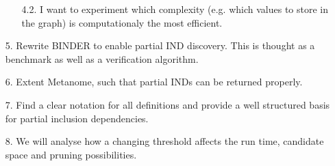 \begin{itemize}
\begin{itemize}
        \item[4.2.] I want to experiment which complexity (e.g. which values to store in the graph) is computationaly the most efficient. 
    \end{itemize}
    \item[5.] Rewrite BINDER to enable partial IND discovery. This is thought as a benchmark as well as a verification algorithm.
    \item[6.] Extent Metanome, such that partial INDs can be returned properly.
    \item[7.] Find a clear notation for all definitions and provide a well structured basis for partial inclusion dependencies.
    \item[8.] We will analyse how a changing threshold affects the run time, candidate space and pruning possibilities.
\end{itemize}